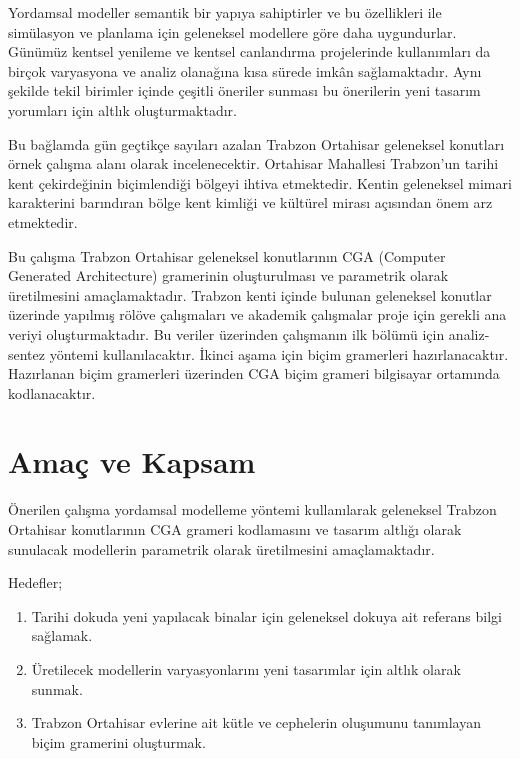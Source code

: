 \documentclass[12pt,turkish,a4paperpaper,]{report}
\begin{document}
Yordamsal modeller semantik bir yapıya sahiptirler ve bu özellikleri ile
simülasyon ve planlama için geleneksel modellere göre daha uygundurlar.
Günümüz kentsel yenileme ve kentsel canlandırma projelerinde
kullanımları da birçok varyasyona ve analiz olanağına kısa sürede imkân
sağlamaktadır. Aynı şekilde tekil birimler içinde çeşitli öneriler
sunması bu önerilerin yeni tasarım yorumları için altlık
oluşturmaktadır.

Bu bağlamda gün geçtikçe sayıları azalan Trabzon Ortahisar geleneksel
konutları örnek çalışma alanı olarak incelenecektir. Ortahisar Mahallesi
Trabzon'un tarihi kent çekirdeğinin biçimlendiği bölgeyi ihtiva
etmektedir. Kentin geleneksel mimari karakterini barındıran bölge kent
kimliği ve kültürel mirası açısından önem arz etmektedir.

Bu çalışma Trabzon Ortahisar geleneksel konutlarının CGA (Computer
Generated Architecture) gramerinin oluşturulması ve parametrik olarak
üretilmesini amaçlamaktadır. Trabzon kenti içinde bulunan geleneksel
konutlar üzerinde yapılmış rölöve çalışmaları ve akademik çalışmalar
proje için gerekli ana veriyi oluşturmaktadır. Bu veriler üzerinden
çalışmanın ilk bölümü için analiz-sentez yöntemi kullanılacaktır. İkinci
aşama için biçim gramerleri hazırlanacaktır. Hazırlanan biçim gramerleri
üzerinden CGA biçim grameri bilgisayar ortamında kodlanacaktır.

\hypertarget{amauxe7-ve-kapsam}{%
\section{Amaç ve Kapsam}\label{amauxe7-ve-kapsam}}

Önerilen çalışma yordamsal modelleme yöntemi kullanılarak geleneksel
Trabzon Ortahisar konutlarının CGA grameri kodlamasını ve tasarım
altlığı olarak sunulacak modellerin parametrik olarak üretilmesini
amaçlamaktadır.

Hedefler;

\begin{enumerate}
\def\labelenumi{\arabic{enumi}.}
\item
  Tarihi dokuda yeni yapılacak binalar için geleneksel dokuya ait
  referans bilgi sağlamak.
\item
  Üretilecek modellerin varyasyonlarını yeni tasarımlar için altlık
  olarak sunmak.
\item
  Trabzon Ortahisar evlerine ait kütle ve cephelerin oluşumunu
  tanımlayan biçim gramerini oluşturmak.
\end{enumerate}
\end{document}
